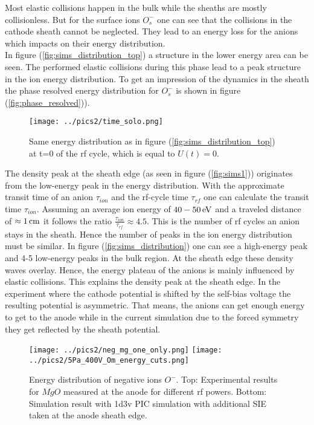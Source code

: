 Most elastic collisions happen in the bulk while the sheaths are mostly collisionless.
But for the surface ions $O^-_s$ one can see that the collisions in the cathode sheath cannot be neglected.
They lead to an energy loss for the anions which impacts on their energy distribution.\\
In figure (\ref{fig:sims_distribution_top}) a structure in the lower energy area can be seen.
The performed elastic collisions during this phase lead to a peak structure in the ion energy distribution.
To get an impression of the dynamics in the sheath the phase resolved energy distribution for $O^-_{s}$ is shown in figure (\ref{fig:phase_resolved})). \\
\begin{figure}[htbp]
    \centering
    \texttt{[image: ../pics2/time\_solo.png]}
    \caption{Same energy distribution as in figure (\ref{fig:sims_distribution_top}) at t=0 of the rf cycle, which is equal to $U(t)=0$.}
    \label{fig:phase_resolved_solo}
\end{figure}
The density peak at the sheath edge (as seen in figure (\ref{fig:sims1})) originates from the low-energy peak in the energy distribution.
With the approximate transit time of an anion $\tau_{ion}$ and the rf-cycle time $\tau_{rf}$ one can calculate the transit time $\tau_{ion}$.
Assuming an average ion energy of $40-50 \,\mathrm{eV}$ and a traveled distance of $\approx 1\,\mathrm{cm}$ it follows the ratio $\frac{\tau_{ion}}{\tau_{rf}}\approx 4.5$.
This is the number of rf cycles an anion stays in the sheath.
Hence the number of peaks in the ion energy distribution must be similar.
In figure (\ref{fig:sims_distribution}) one can see a high-energy peak and 4-5 low-energy peaks in the bulk region. 
At the sheath edge these density waves overlay.
Hence, the energy plateau of the anions is mainly influenced by elastic collisions.
This explains the density peak at the sheath edge.
In the experiment where the cathode potential is shifted by the self-bias voltage the resulting potential is asymmetric. 
That means, the anions can get enough energy to get to the anode while in the current simulation due to the forced symmetry they get reflected by the sheath potential.
\begin{figure}[htbp]
        \centering
    \texttt{[image: ../pics2/neg\_mg\_one\_only.png]}
    \centering
    \texttt{[image: ../pics2/5Pa\_400V\_Om\_energy\_cuts.png]}
    \caption{Energy distribution of negative ions $O^-$. Top: Experimental results for $MgO$ measured at the anode for different rf powers. Bottom: Simulation result with 1d3v PIC simulation with additional SIE taken at the anode sheath edge.}
    \label{fig:compare_ied}
\end{figure}
